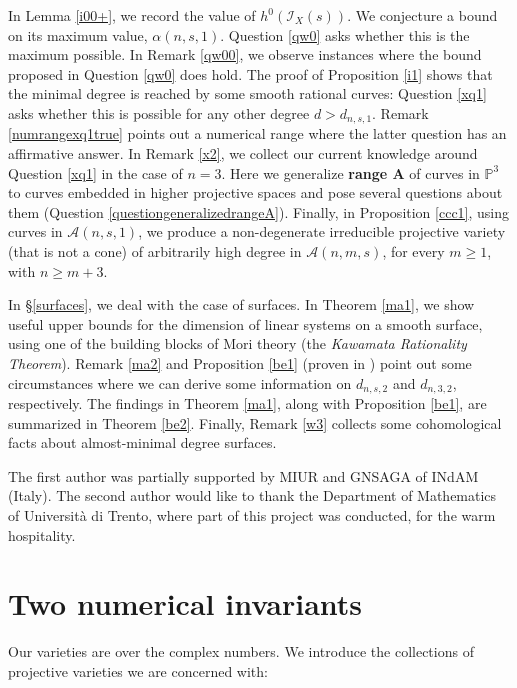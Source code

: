 \documentclass[a4, 11pt]{amsart}
\theoremstyle{plain}
\theoremstyle{definition}
\newcommand{\enm}[1]{\ensuremath{#1}}          %
\newcommand{\cal}[1]{\mathcal{#1}}
\newcommand{\PP}{\enm{\mathbb{P}}}
\newcommand{\Aa}{\enm{\cal{A}}}
\begin{document}
In Lemma \ref{i00+}, we record the value of $h^0(\mathcal I_X(s))$. We conjecture a bound on its maximum value, $\alpha(n,s,1)$. Question \ref{qw0} asks whether this is the maximum possible. In Remark \ref{qw00}, we observe instances where the bound proposed in Question \ref{qw0} does hold. 
The proof of Proposition \ref{i1} shows that the minimal degree is reached by some smooth rational curves: Question \ref{xq1} asks whether this is possible for any other degree $d > d_{n,s,1}$. Remark \ref{numrangexq1true} points out a numerical range where the latter question has an affirmative answer. 
In Remark \ref{x2}, we collect our current knowledge around Question \ref{xq1} in the case of $n=3$. Here we generalize {\bf range A} of curves
in $\PP^3$ to curves embedded in higher projective spaces and pose several questions about them (Question \ref{questiongeneralizedrangeA}). 
Finally, in Proposition \ref{ccc1}, using curves in $\Aa(n,s,1)$, we produce a non-degenerate irreducible projective variety (that is not a cone) of arbitrarily high degree in $\Aa(n,m,s)$, for every $m\geq 1$, with $n\geq m+3$. 

In \S\ref{surfaces}, we deal with the case of surfaces. In Theorem \ref{ma1}, we show useful upper bounds for the dimension of linear systems on a smooth surface, using one of the building blocks of Mori theory (the {\it Kawamata Rationality Theorem}). Remark \ref{ma2} and Proposition \ref{be1} (proven in \cite{bea}) point out some circumstances where we can derive some information on $d_{n,s,2}$ and $d_{n,3,2}$, respectively. The findings in Theorem \ref{ma1}, along with Proposition \ref{be1}, are summarized in Theorem \ref{be2}. Finally, Remark \ref{w3} collects some cohomological facts about almost-minimal degree surfaces. \\
\vspace{3mm}

\begin{small}
 The first author was partially supported by MIUR and GNSAGA of INdAM (Italy). The second author would like to thank the Department of Mathematics of Universit\`{a} di Trento, where part of this project was conducted, for the warm hospitality. 
\end{small}

\section{Two numerical invariants}\label{notation}
Our varieties are over the complex numbers. We introduce the collections of projective varieties we are concerned with: 
\end{document}
